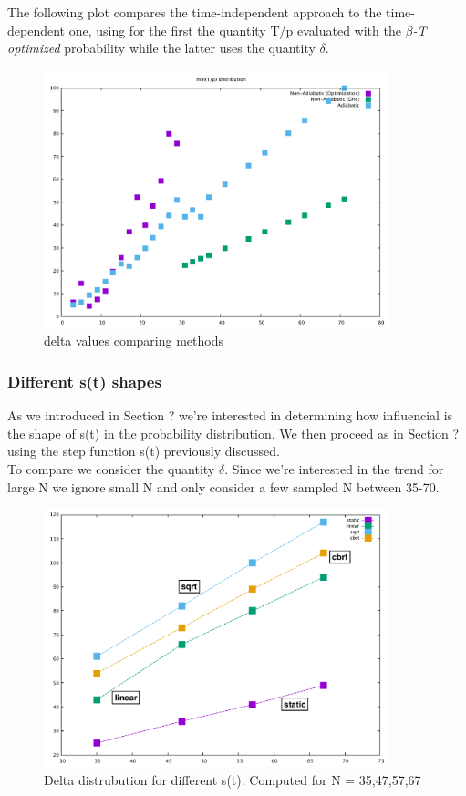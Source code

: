 \documentclass[aps,pra,reprint, onecolumn, showkeys]{revtex4-2}
\begin{document}
The following plot compares the time-independent approach to the time-dependent one, using for the first the quantity T/p evaluated with the \textit{$\beta$-T optimized} probability while the latter uses the quantity $\delta$. \\

\begin{figure}[ht]
\includegraphics[width=10cm]{./figures/delta.pdf}%
\caption{delta values comparing methods}
\end{figure}


\subsubsection{Different s(t) shapes}
As we introduced in Section ? we're interested in determining how influencial is the shape of s(t) in the probability distribution. We then proceed as in Section ? using the step function s(t) previously discussed. \\ To compare we consider the quantity $\delta$. Since we're interested in the trend for large N we ignore small N and only consider a few sampled N between 35-70.

\clearpage
\begin{figure}[ht]
\includegraphics[width=10cm]{./figures/9_Giugno.pdf}
\caption{Delta distrubution for different s(t). Computed for N = 35,47,57,67}
\end{figure}
\end{document}
